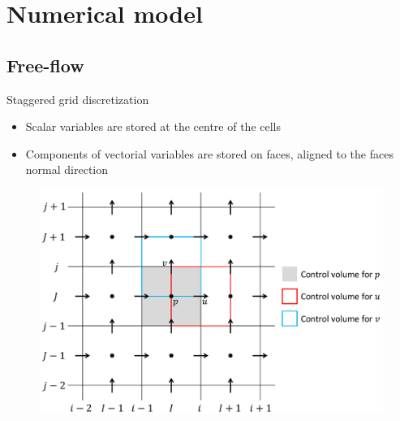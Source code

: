 \documentclass{beamer}
\begin{document}
\section{Numerical model}
\subsection*{Free-flow}
\begin{frame}{Staggered grid discretization}
\begin{itemize}
	\item Scalar variables are stored at the centre of the 
	cells
	\item Components of vectorial variables are stored on faces, aligned to the 
	faces normal direction
\end{itemize}
\begin{figure}
	\centering
	\includegraphics[trim={2cm 1cm 0cm 0cm}, clip, 
	height=0.65\textheight]{staggered_grid_mia.pdf}
\end{figure}
\end{frame}
\end{document}
